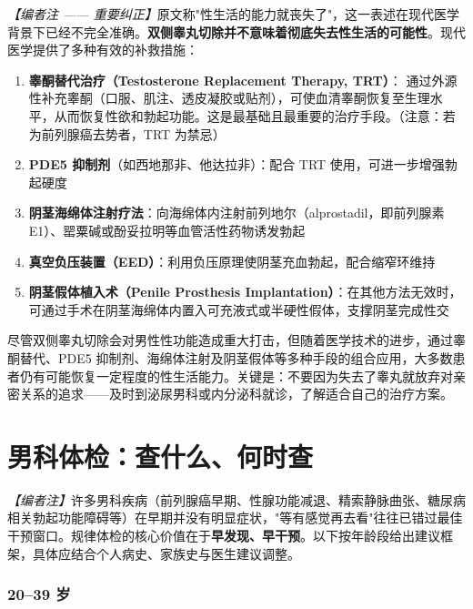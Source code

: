 \noindent\textit{【编者注 —— 重要纠正】}原文称"性生活的能力就丧失了"，这一表述在现代医学背景下已经不完全准确。\textbf{双侧睾丸切除并不意味着彻底失去性生活的可能性}。现代医学提供了多种有效的补救措施：

\begin{enumerate}
	\item \textbf{睾酮替代治疗（Testosterone Replacement Therapy, TRT）}：
	通过外源性补充睾酮（口服、肌注、透皮凝胶或贴剂），可使血清睾酮恢复至生理水平，从而恢复性欲和勃起功能。这是最基础且最重要的治疗手段。（注意：若为前列腺癌去势者，TRT 为禁忌）

	\item \textbf{PDE5 抑制剂}（如西地那非、他达拉非）：配合 TRT 使用，可进一步增强勃起硬度

	\item \textbf{阴茎海绵体注射疗法}：向海绵体内注射前列地尔（alprostadil，即前列腺素 E1）、罂粟碱或酚妥拉明等血管活性药物诱发勃起

	\item \textbf{真空负压装置（EED）}：利用负压原理使阴茎充血勃起，配合缩窄环维持

	\item \textbf{阴茎假体植入术（Penile Prosthesis Implantation）}：在其他方法无效时，可通过手术在阴茎海绵体内置入可充液式或半硬性假体，支撑阴茎完成性交
\end{enumerate}

\begin{tcolorbox}[colback=pink!5!white,colframe=red!50!black,title=贴心小叮咛]
尽管双侧睾丸切除会对男性性功能造成重大打击，但随着医学技术的进步，通过睾酮替代、PDE5 抑制剂、海绵体注射及阴茎假体等多种手段的组合应用，大多数患者仍有可能恢复一定程度的性生活能力。关键是：不要因为失去了睾丸就放弃对亲密关系的追求——及时到泌尿男科或内分泌科就诊，了解适合自己的治疗方案。
\end{tcolorbox}

\section{男科体检：查什么、何时查}

\noindent\textit{【编者注】}许多男科疾病（前列腺癌早期、性腺功能减退、精索静脉曲张、糖尿病相关勃起功能障碍等）在早期并没有明显症状，"等有感觉再去看"往往已错过最佳干预窗口。规律体检的核心价值在于\textbf{早发现、早干预}。以下按年龄段给出建议框架，具体应结合个人病史、家族史与医生建议调整。

\subsubsection{20--39 岁}

